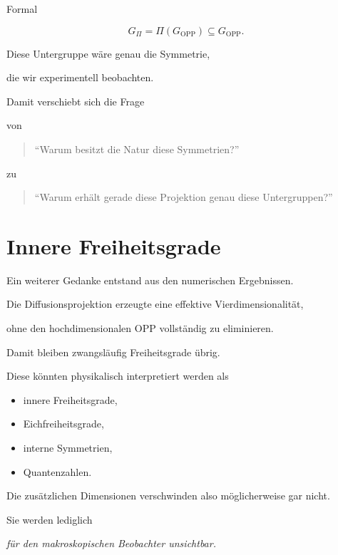Formal

\[
G_{\Pi}
=
\Pi(G_{\mathrm{OPP}})
\subseteq
G_{\mathrm{OPP}}.
\]

Diese Untergruppe wäre genau die Symmetrie,

die wir experimentell beobachten.

Damit verschiebt sich die Frage

von

\begin{quote}

``Warum besitzt die Natur diese Symmetrien?''

\end{quote}

zu

\begin{quote}

``Warum erhält gerade diese Projektion genau diese Untergruppen?''

\end{quote}

\section*{Innere Freiheitsgrade}

Ein weiterer Gedanke entstand aus den numerischen Ergebnissen.

Die Diffusionsprojektion erzeugte eine effektive Vierdimensionalität,

ohne den hochdimensionalen OPP vollständig zu eliminieren.

Damit bleiben zwangsläufig Freiheitsgrade übrig.

Diese könnten physikalisch interpretiert werden als

\begin{itemize}

\item innere Freiheitsgrade,

\item Eichfreiheitsgrade,

\item interne Symmetrien,

\item Quantenzahlen.

\end{itemize}

Die zusätzlichen Dimensionen verschwinden also möglicherweise gar nicht.

Sie werden lediglich

\begin{center}

\emph{für den makroskopischen Beobachter unsichtbar.}

\end{center}

